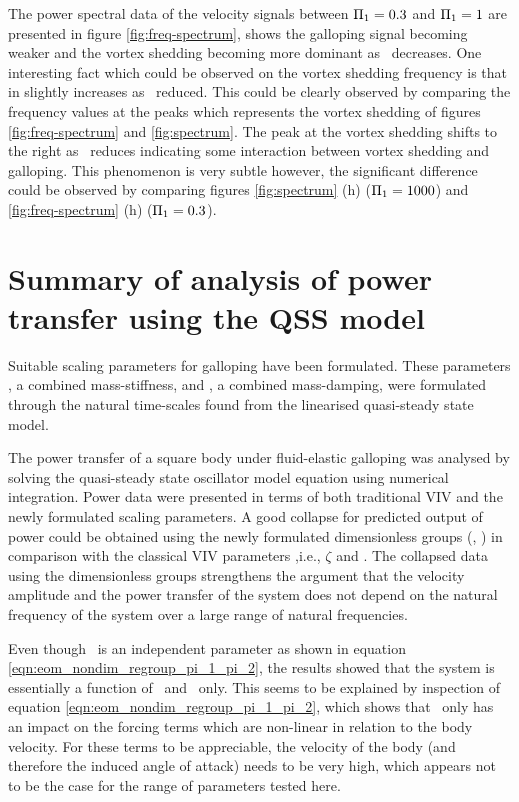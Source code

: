  The power spectral data of the velocity signals between $\Pi_1=0.3$ and $\Pi_1=1$ are presented in figure \ref{fig:freq-spectrum}, shows the galloping signal becoming weaker and the vortex shedding becoming more dominant as \massstiff\ decreases. One interesting fact which could be observed on the vortex shedding frequency is that in slightly increases as \massstiff\ reduced. This could be clearly observed by comparing the frequency values at the peaks which represents the vortex shedding of figures \ref{fig:freq-spectrum} and \ref{fig:spectrum}. The peak at the vortex shedding shifts to the right as \massstiff\ reduces indicating some interaction between vortex shedding and galloping. This phenomenon is very subtle however, the significant difference could be observed by comparing  figures \ref{fig:spectrum} (h) ($\Pi_1=1000$) and  \ref{fig:freq-spectrum} (h) ($\Pi_1=0.3$). 


\section{Summary of analysis of power transfer using the QSS model}
\label{sec:summary-pi_1-pi_2}

Suitable scaling parameters for galloping have been formulated. These parameters \massstiff, a combined mass-stiffness, and \massdamp, a combined mass-damping, were formulated through the natural time-scales found from the linearised quasi-steady state model.   

The power transfer of a square body under fluid-elastic galloping was analysed by solving the quasi-steady state oscillator model equation using numerical  integration. Power data were presented in terms of both traditional VIV and the newly formulated scaling parameters. A good collapse for predicted output of power could be obtained using the newly formulated  dimensionless groups (\massstiff, \massdamp) in comparison with the classical VIV parameters ,i.e., $\zeta$ and \ustar. The collapsed data using the dimensionless groups strengthens the argument that the velocity amplitude and the power transfer of the system does not depend on the natural frequency of the system over a large range of natural frequencies.

Even though \mstar\ is an independent parameter as shown in equation \ref{eqn:eom_nondim_regroup_pi_1_pi_2}, the results showed that the system is essentially a function of \massstiff\ and \massdamp\ only.  This seems to be explained by inspection of  equation \ref{eqn:eom_nondim_regroup_pi_1_pi_2}, which shows that \mstar\ only has an impact on the forcing terms which are non-linear in relation to the body velocity. For these terms to be appreciable, the velocity of the body (and therefore the induced angle of attack) needs to be very high, which appears not to be the case for the range of parameters tested here. 


